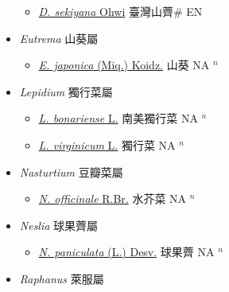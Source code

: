 \begin{itemize}
  \begin{itemize}
        \item[] \href{http://www.theplantlist.org/tpl1.1/search?q=Draba+sekiyana}{\textit{D. sekiyana} Ohwi}   臺灣山薺\# EN
  \end{itemize}
 \item[] \textit{Eutrema} 山葵屬
                    
  \begin{itemize}
        \item[] \href{http://www.theplantlist.org/tpl1.1/search?q=Eutrema+japonica}{\textit{E. japonica} (Miq.) Koidz.}   山葵 NA $^n$
  \end{itemize}
 \item[] \textit{Lepidium} 獨行菜屬
                    
  \begin{itemize}
        \item[] \href{http://www.theplantlist.org/tpl1.1/search?q=Lepidium+bonariense}{\textit{L. bonariense} L.}   南美獨行菜 NA $^n$
        \item[] \href{http://www.theplantlist.org/tpl1.1/search?q=Lepidium+virginicum}{\textit{L. virginicum} L.}   獨行菜 NA $^n$
  \end{itemize}
 \item[] \textit{Nasturtium} 豆瓣菜屬
                    
  \begin{itemize}
        \item[] \href{http://www.theplantlist.org/tpl1.1/search?q=Nasturtium+officinale}{\textit{N. officinale} R.Br.}   水芥菜 NA $^n$
  \end{itemize}
 \item[] \textit{Neslia} 球果薺屬
                    
  \begin{itemize}
        \item[] \href{http://www.theplantlist.org/tpl1.1/search?q=Neslia+paniculata}{\textit{N. paniculata} (L.) Desv.}   球果薺 NA $^n$
  \end{itemize}
 \item[] \textit{Raphanus} 萊服屬
                    

\end{itemize}
